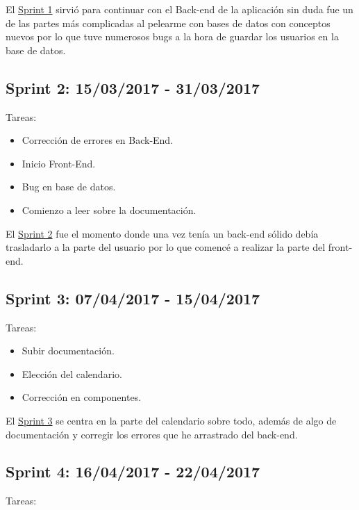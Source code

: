 El  \underline{Sprint 1} sirvió para continuar con el Back-end de la aplicación sin duda fue un de las partes más complicadas al pelearme con bases de datos con conceptos nuevos por lo que tuve numerosos bugs a la hora de guardar los usuarios en la base de datos.

\subsection{Sprint 2: 15/03/2017 - 31/03/2017}\label{sprint2}

Tareas:

\begin{itemize}
	\item Corrección de errores en Back-End.
	\item Inicio Front-End.
	\item Bug en base de datos.
	\item Comienzo a leer sobre la documentación.
\end{itemize}


El \underline{Sprint 2} fue el momento donde una vez tenía un back-end sólido debía trasladarlo a la parte del usuario por lo que comencé a realizar la parte del front-end.

\subsection{Sprint 3: 07/04/2017 - 15/04/2017}\label{sprint3}

Tareas:

\begin{itemize}
	\item Subir documentación.
	\item Elección del calendario.
	\item Corrección en componentes.
\end{itemize}


El \underline{Sprint 3} se centra en la parte del calendario sobre todo, además de algo de documentación y corregir los errores que he arrastrado del back-end.

\subsection{Sprint 4: 16/04/2017 - 22/04/2017}\label{sprint4}

Tareas:

